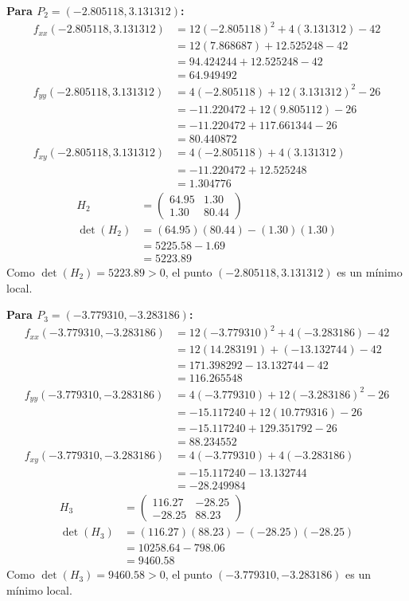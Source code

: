 \documentclass{article}
\begin{document}
\textbf{Para $P_2 = (-2.805118, 3.131312)$:}
\begin{align}
f_{xx}(-2.805118, 3.131312) &= 12(-2.805118)^2 + 4(3.131312) - 42 \\
&= 12(7.868687) + 12.525248 - 42 \\
&= 94.424244 + 12.525248 - 42 \\
&= 64.949492 \\
f_{yy}(-2.805118, 3.131312) &= 4(-2.805118) + 12(3.131312)^2 - 26 \\
&= -11.220472 + 12(9.805112) - 26 \\
&= -11.220472 + 117.661344 - 26 \\
&= 80.440872 \\
f_{xy}(-2.805118, 3.131312) &= 4(-2.805118) + 4(3.131312) \\
&= -11.220472 + 12.525248 \\
&= 1.304776
\end{align}
\begin{align}
H_2 &= \begin{pmatrix} 64.95 & 1.30 \\ 1.30 & 80.44 \end{pmatrix} \\
\det(H_2) &= (64.95)(80.44) - (1.30)(1.30) \\
&= 5225.58 - 1.69 \\
&= 5223.89
\end{align}
Como $\det(H_2) = 5223.89 > 0$, el punto $(-2.805118, 3.131312)$ es un mínimo local.

\textbf{Para $P_3 = (-3.779310, -3.283186)$:}
\begin{align}
f_{xx}(-3.779310, -3.283186) &= 12(-3.779310)^2 + 4(-3.283186) - 42 \\
&= 12(14.283191) + (-13.132744) - 42 \\
&= 171.398292 - 13.132744 - 42 \\
&= 116.265548 \\
f_{yy}(-3.779310, -3.283186) &= 4(-3.779310) + 12(-3.283186)^2 - 26 \\
&= -15.117240 + 12(10.779316) - 26 \\
&= -15.117240 + 129.351792 - 26 \\
&= 88.234552 \\
f_{xy}(-3.779310, -3.283186) &= 4(-3.779310) + 4(-3.283186) \\
&= -15.117240 - 13.132744 \\
&= -28.249984
\end{align}
\begin{align}
H_3 &= \begin{pmatrix} 116.27 & -28.25 \\ -28.25 & 88.23 \end{pmatrix} \\
\det(H_3) &= (116.27)(88.23) - (-28.25)(-28.25) \\
&= 10258.64 - 798.06 \\
&= 9460.58
\end{align}
Como $\det(H_3) = 9460.58 > 0$, el punto $(-3.779310, -3.283186)$ es un mínimo local.
\end{document}
